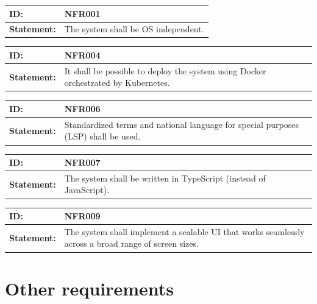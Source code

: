 \documentclass{scrreprt}
\begin{document}
\begin{center}
\begin{tabularx}{\linewidth}{| l | X |}
 \hline
 \textbf{ID:} & NFR001  \\ 
 \hline
 \textbf{Statement:} & The system shall be OS independent.
 \\ 
 \hline
\end{tabularx}
\end{center}

\begin{center}
\begin{tabularx}{\linewidth}{| l | X |}
 \hline
 \textbf{ID:} & NFR004  \\ 
 \hline
 \textbf{Statement:} & It shall be possible to deploy the system using Docker orchestrated by Kubernetes.
 \\ 
 \hline
\end{tabularx}
\end{center}

\begin{center}
\begin{tabularx}{\linewidth}{| l | X |}
 \hline
 \textbf{ID:} & NFR006  \\ 
 \hline
 \textbf{Statement:} & Standardized terms and national language for special purposes (LSP) shall be used. 
 \\ 
 \hline
\end{tabularx}
\end{center}

\begin{center}
\begin{tabularx}{\linewidth}{| l | X |}
 \hline
 \textbf{ID:} & NFR007  \\ 
 \hline
 \textbf{Statement:} & The system shall be written in TypeScript (instead of JavaScript).
 \\ 
 \hline
\end{tabularx}
\end{center}

\begin{center}
\begin{tabularx}{\linewidth}{| l | X |}
 \hline
 \textbf{ID:} & NFR009  \\ 
 \hline
 \textbf{Statement:} & The system shall implement a scalable UI that works seamlessly across a broad range of screen sizes.
 \\ 
 \hline
\end{tabularx}
\end{center}


\section{Other requirements}
\end{document}
